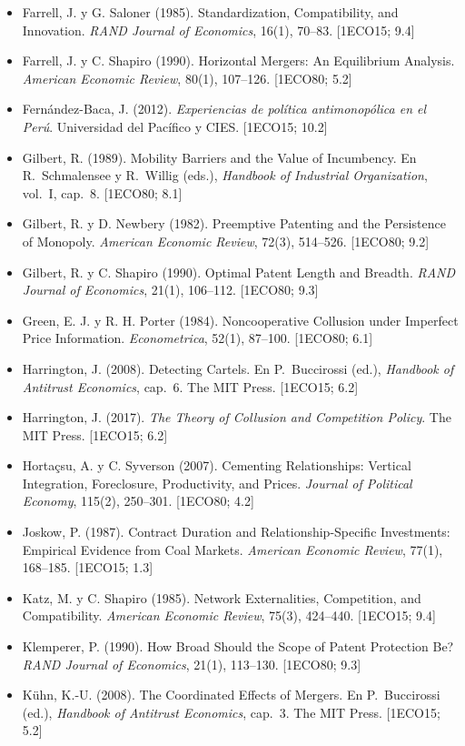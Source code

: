 \documentclass[11pt,a4paper]{article}
\begin{document}
{\begin{itemize}[leftmargin=1.4em,itemsep=1pt,label={}]
\item Farrell, J. y G. Saloner (1985). Standardization, Compatibility, and Innovation. \emph{RAND Journal of Economics}, 16(1), 70--83. [1ECO15; 9.4]
\item Farrell, J. y C. Shapiro (1990). Horizontal Mergers: An Equilibrium Analysis. \emph{American Economic Review}, 80(1), 107--126. [1ECO80; 5.2]
\item Fernández-Baca, J. (2012). \emph{Experiencias de política antimonopólica en el Perú}. Universidad del Pacífico y CIES. [1ECO15; 10.2]
\item Gilbert, R. (1989). Mobility Barriers and the Value of Incumbency. En R.~Schmalensee y R.~Willig (eds.), \emph{Handbook of Industrial Organization}, vol.~I, cap.~8. [1ECO80; 8.1]
\item Gilbert, R. y D. Newbery (1982). Preemptive Patenting and the Persistence of Monopoly. \emph{American Economic Review}, 72(3), 514--526. [1ECO80; 9.2]
\item Gilbert, R. y C. Shapiro (1990). Optimal Patent Length and Breadth. \emph{RAND Journal of Economics}, 21(1), 106--112. [1ECO80; 9.3]
\item Green, E. J. y R. H. Porter (1984). Noncooperative Collusion under Imperfect Price Information. \emph{Econometrica}, 52(1), 87--100. [1ECO80; 6.1]
\item Harrington, J. (2008). Detecting Cartels. En P.~Buccirossi (ed.), \emph{Handbook of Antitrust Economics}, cap.~6. The MIT Press. [1ECO15; 6.2]
\item Harrington, J. (2017). \emph{The Theory of Collusion and Competition Policy}. The MIT Press. [1ECO15; 6.2]
\item Hortaçsu, A. y C. Syverson (2007). Cementing Relationships: Vertical Integration, Foreclosure, Productivity, and Prices. \emph{Journal of Political Economy}, 115(2), 250--301. [1ECO80; 4.2]
\item Joskow, P. (1987). Contract Duration and Relationship-Specific Investments: Empirical Evidence from Coal Markets. \emph{American Economic Review}, 77(1), 168--185. [1ECO15; 1.3]
\item Katz, M. y C. Shapiro (1985). Network Externalities, Competition, and Compatibility. \emph{American Economic Review}, 75(3), 424--440. [1ECO15; 9.4]
\item Klemperer, P. (1990). How Broad Should the Scope of Patent Protection Be? \emph{RAND Journal of Economics}, 21(1), 113--130. [1ECO80; 9.3]
\item Kühn, K.-U. (2008). The Coordinated Effects of Mergers. En P.~Buccirossi (ed.), \emph{Handbook of Antitrust Economics}, cap.~3. The MIT Press. [1ECO15; 5.2]

\end{itemize}}
\end{document}
